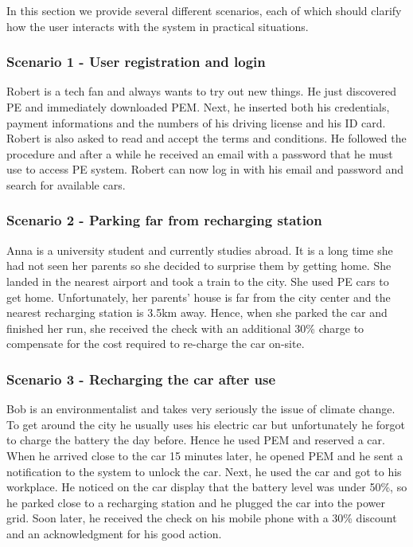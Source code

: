 In this section we provide several different scenarios, each of which should clarify how the user interacts with the system in practical situations. 

\subsubsection{Scenario 1 - User registration and login}
Robert is a tech fan and always wants to try out new things. He just discovered PE and immediately downloaded PEM. Next, he inserted both his credentials, payment informations and the numbers of his driving license and his ID card. Robert is also asked to read and accept the terms and conditions. He followed the procedure and after a while he received an email with a password that he must use to access PE system. Robert can now log in with his email and password and search for available cars.

\subsubsection{Scenario 2 - Parking far from recharging station}
Anna is a university student and currently studies abroad. It is a long time she had not seen her parents so she decided to surprise them by getting home. She landed in the nearest airport and took a train to the city. She used PE cars to get home. Unfortunately, her parents' house is far from the city center and the nearest recharging station is 3.5km away. Hence, when she parked the car and finished her run, she received the check with an additional 30\% charge to compensate for the cost required to re-charge the car on-site. 

\subsubsection{Scenario 3 - Recharging the car after use}
Bob is an environmentalist and takes very seriously the issue of climate change. To get around the city he usually uses his electric car but unfortunately he forgot to charge the battery the day before. Hence he used PEM and reserved a car. When he arrived close to the car 15 minutes later, he opened PEM and he sent a notification to the system to unlock the car. Next, he used the car and got to his workplace. He noticed on the car display that the battery level was under 50\%, so he parked close to a recharging station and he plugged the car into the power grid. Soon later, he received the check on his mobile phone with a 30\% discount and an acknowledgment for his good action.

